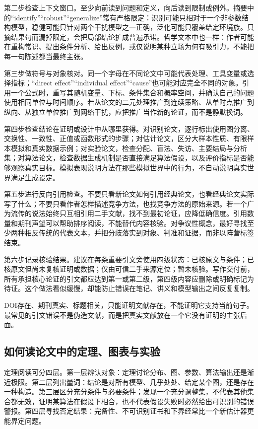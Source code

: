 第二步检查上下文窗口。至少向前读到问题和定义，向后读到限制或例外。摘要中的“identify”“robust”“generalize”常有严格限定：识别可能只相对于一个非参数结构模型，稳健可能只针对两个干扰模型之一正确，泛化可能只覆盖给定环境族。只摘结果句而漏掉限定，会把局部结论扩成普遍承诺。哲学文本中也一样：作者可能在重构常识、提出条件分析、给出反例，或仅说明某种立场为何有吸引力，不能把每一句陈述都当最终主张。

第三步做符号与对象核对。同一个字母在不同论文中可能代表处理、工具变量或选择指标；“direct effect”“individual effect”“cause”也可能对应完全不同的对象。引用一个公式时，重写其随机变量、下标、条件集合和概率空间，并确认自己的问题使用相同单位与时间顺序。若从论文的二元处理推广到连续策略、从单时点推广到纵向、从独立单位推广到网络干扰，应把推广当作新的论证，而不是静默换词。

第四步检查结论在证明或设计中从哪里获得。对识别论文，逐行标出使用图分离、交换性、一致性、正值或函数形式的步骤；对估计论文，区分大样本性质、有限样本模拟和真实数据示例；对实验论文，检查分配、盲法、失访、主要结局与分析集；对算法论文，检查数据生成机制是否直接满足算法假设，以及评价指标是否能够观察真实目标。模拟表现说明方法在那些模拟世界中的行为，不自动说明真实世界满足生成设定。

第五步进行反向引用检查。不要只看新论文如何引用经典论文，也看经典论文实际写了什么；不要只看作者怎样描述竞争方法，也找竞争方法的原始来源。若一个广为流传的说法始终只互相引用二手文献，找不到最初论证，应降低确信度。引用数量和期刊声望可以帮助排序阅读，不能替代内容核验。对争议性概念，最好寻找至少两种相反传统的代表文本，并把分歧落实到对象、判准和证据，而非以阵营标签结束。

第六步记录核验结果。建议在每条重要引文旁使用四级状态：已核原文与条件；已核原文但尚未复核证明或数据；仅由可信二手来源定位；暂未核验。写作交付前，所有承担核心论证的引文都应达到第一或第二级，第四级内容应删除或明确标记为待证。这个做法看似缓慢，却能防止错误在笔记、讲义和模型输出之间反复复制。

\begin{keypoint}
DOI存在、期刊真实、标题相关，只能证明文献存在，不能证明它支持当前句子。最常见的引文错误不是伪造文献，而是把真实文献放在一个它没有证明的主张后面。
\end{keypoint}

\subsection*{如何读论文中的定理、图表与实验}

定理阅读可分四层。第一层辨认对象：定理讨论分布、图、参数、算法输出还是渐近极限。第二层列出量词：结论是对所有模型、几乎处处、给定某个图，还是存在一种构造。第三层区分充分条件与必要条件；发现一个充分调整集，不代表其他集合都无效，证明某算法在假设下相合，也不代表假设失败时必然给出可识别的错误警报。第四层寻找否定结果：完备性、不可识别证书和下界经常比一个新估计器更能界定问题。

